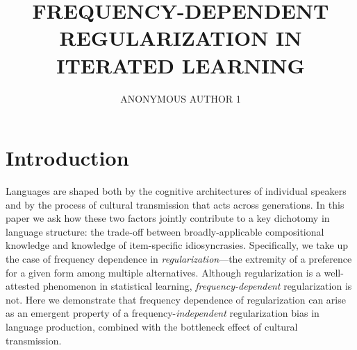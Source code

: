 \documentclass{evolang11}
\begin{document}
\title{FREQUENCY-DEPENDENT REGULARIZATION IN ITERATED LEARNING}

\author{ANONYMOUS AUTHOR 1}

\address{University Department, University Name \\ City, Country\\email@university}

\maketitle



\section{Introduction}
Languages are shaped both by the cognitive architectures of individual speakers and by the process of cultural transmission that acts across generations. In this paper we ask how these two factors jointly contribute to a key dichotomy in language structure: the trade-off between broadly-applicable compositional knowledge and knowledge of item-specific idiosyncrasies. Specifically, we take up the case of frequency dependence in \emph{regularization}---the extremity of a preference for a given form among multiple alternatives. Although regularization is a well-attested phenomenon in statistical learning, \emph{frequency-dependent} regularization is not. Here we demonstrate that frequency dependence of regularization can arise as an emergent property of a frequency-\emph{independent} regularization bias in language production, combined with the bottleneck effect of cultural transmission.
\end{document}
